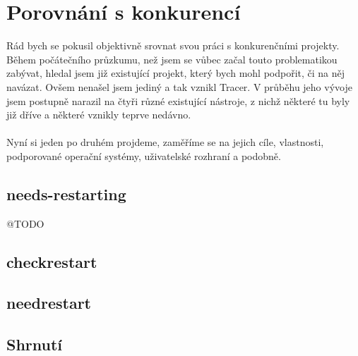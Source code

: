 \documentclass[10pt,a4paper]{article}
\begin{document}
	\newpage
	\section{Porovnání s konkurencí}
		Rád bych se pokusil objektivně srovnat svou práci s konkurenčními projekty. Během počátečního průzkumu, než jsem se vůbec začal touto problematikou zabývat, hledal jsem již existující projekt, který bych mohl podpořit, či na něj navázat. Ovšem nenašel jsem jediný a tak vznikl Tracer. V průběhu jeho vývoje jsem postupně narazil na čtyři různé existující nástroje, z nichž některé tu byly již dříve a některé vznikly teprve nedávno.
		\\
		\\
		Nyní si jeden po druhém projdeme, zaměříme se na jejich cíle, vlastnosti, podporované operační systémy, uživatelské rozhraní a podobně.
		\subsection{needs-restarting}
		@TODO
		\subsection{checkrestart}
		\subsection{needrestart}
		\subsection{Shrnutí}
\end{document}
